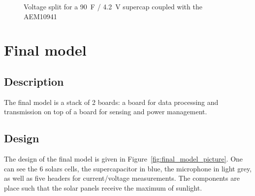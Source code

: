 \documentclass{EPL-master-thesis-covers-EN}
\begin{document}
\begin{figure}[H]
\centering
{}
\caption{Voltage split for a \SI{90}{F} / \SI{4.2}{V} supercap coupled with the AEM10941}
\label{fig:Supercap_voltage_voltage_split}
\end{figure}


\chapter{Final model}

\section{Description}

The final model is a stack of 2 boards: a board for data processing and transmission on top of a board for sensing and power management.

\section{Design}

The design of the final model is given in Figure~\ref{fig:final_model_picture}. One can see the 6 solars cells, the supercapacitor in blue, the microphone in light grey, as well as five headers for current/voltage measurements. The components are place such that the solar panels receive the maximum of sunlight.
\end{document}
